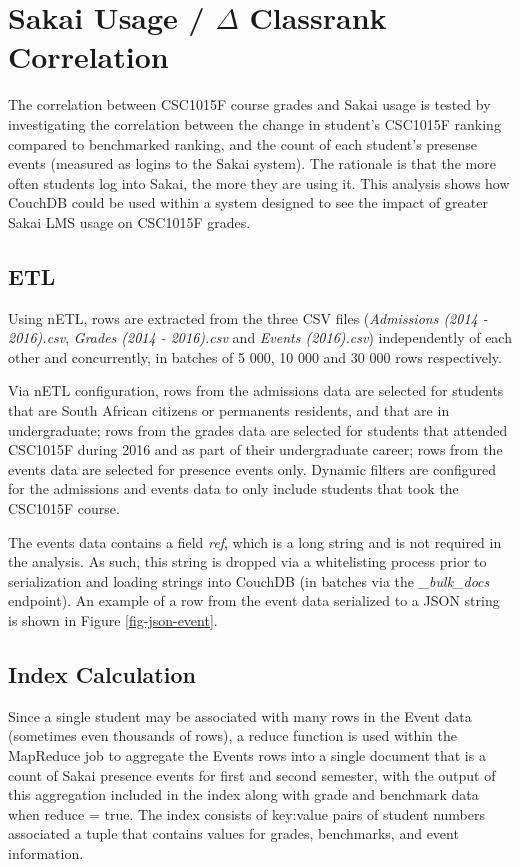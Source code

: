 \section{Sakai Usage / \texorpdfstring{$\Delta$}{Lg} Classrank Correlation}
The correlation between CSC1015F course grades and Sakai usage is tested by investigating the correlation between the change in student's CSC1015F ranking compared to benchmarked ranking, and the count of each student's presense events (measured as logins to the Sakai system). The rationale is that the more often students log into Sakai, the more they are using it. This analysis shows how CouchDB could be used within a system designed to see the impact of greater Sakai LMS usage on CSC1015F grades.

\subsection{ETL}
Using nETL, rows are extracted from the three CSV files (\textit{Admissions (2014 - 2016).csv}, \textit{Grades (2014 - 2016).csv} and \textit{Events (2016).csv}) independently of each other and concurrently, in batches of 5 000, 10 000 and 30 000 rows respectively.

Via nETL configuration, rows from the admissions data are selected for students that are South African citizens or permanents residents, and that are in undergraduate; rows from the grades data are selected for students that attended CSC1015F during 2016 and as part of their undergraduate career; rows from the events data are selected for presence events only. Dynamic filters are configured for the admissions and events data to only include students that took the CSC1015F course.

The events data contains a field \textit{ref}, which is a long string and is not required in the analysis. As such, this string is dropped via a whitelisting process prior to serialization and loading strings into CouchDB (in batches via the \textit{\_bulk\_docs} endpoint). An example of a row from the event data serialized to a JSON string is shown in Figure \ref{fig-json-event}.



\subsection{Index Calculation}
Since a single student may be associated with many rows in the Event data (sometimes even thousands of rows), a reduce function is used within the MapReduce job to aggregate the Events rows into a single document that is a count of Sakai presence events for first and second semester, with the output of this aggregation included in the index along with grade and benchmark data when reduce = true. The index consists of key:value pairs of student numbers associated a tuple that contains values for grades, benchmarks, and event information.

